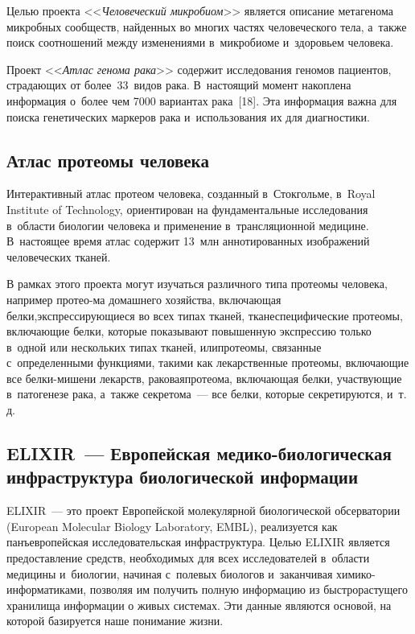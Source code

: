 \begin{multicols}{2}
  Целью проекта <<\textit{Человеческий микробиом}>> является описание метагенома 
микробных сообществ, найденных во многих частях человеческого тела, а~также поиск 
соотношений между изменениями в~микробиоме и~здоровьем человека. 
  
  Проект <<\textit{Атлас генома рака}>> содержит исследования геномов пациентов, 
страдающих от более~33~видов рака. В~настоящий момент накоплена информация о~более 
чем 7000 вариантах рака~[18]. Эта информация важна для поиска генетических маркеров 
рака и~использования их для диагно\-стики.

\subsection{Атлас протеомы человека}

  Интерактивный атлас протеом человека, созданный в~Стокгольме, в~Royal Institute of 
Technology, ориентирован на фундаментальные исследования в~области биологии человека 
и применение в~трансляционной медицине. В~настоящее время атлас содержит 13~млн 
аннотированных изображений человеческих тканей.
  
  В рамках этого проекта могут изучаться различ\-ного типа протеомы человека, например 
протео-\linebreak ма домашнего хозяйства, включающая белки,\linebreak экспрессирующиеся во всех типах 
тканей, тканеспецифические протеомы, включающие белки, которые показывают 
повышенную экспрессию только в~одной или нескольких типах тканей, или\linebreak протеомы, 
связанные с~определенными функциями, такими как лекарственные протеомы, 
вклю\-ча\-ющие все бел\-ки-ми\-ше\-ни лекарств, раковая\linebreak протеома, включающая белки, 
участвующие в~патогенезе рака, а~так\-же секретома~--- все белки, которые сек\-ре\-ти\-ру\-ют\-ся, 
и~т.\,д.

\subsection{ELIXIR~--- Европейская медико-биологическая инфраструктура 
биологической информации}

  ELIXIR~--- это проект Европейской молекулярной биологической обсерватории 
(European Molecular Biology Laboratory, EMBL), реализуется как панъевропейская исследовательская инфраструктура. Целью 
ELIXIR является пред\-остав\-ле\-ние средств, необходимых для всех исследователей в~области 
медицины и~биологии, начиная с~полевых биологов и~заканчивая хи\-ми\-ко-ин\-фор\-ма\-ти\-ка\-ми, 
позволяя им получить полную информацию из быстрорастущего хранилища информации 
о живых системах. Эти данные являются основой, на которой базируется наше понимание 
жизни. 
  

\end{multicols}
